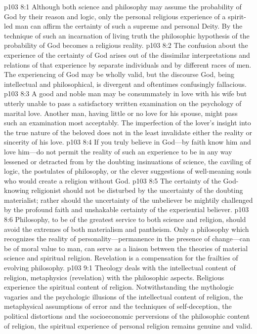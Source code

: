 \vs p103 8:1 Although both science and philosophy may assume the probability of God by their reason and logic, only the personal religious experience of a spirit\hyp{}led man can affirm the certainty of such a supreme and personal Deity. By the technique of such an incarnation of living truth the philosophic hypothesis of the probability of God becomes a religious reality.
\vs p103 8:2 The confusion about the experience of the certainty of God arises out of the dissimilar interpretations and relations of that experience by separate individuals and by different races of men. The experiencing of God may be wholly valid, but the discourse  God, being intellectual and philosophical, is divergent and oftentimes confusingly fallacious.
\vs p103 8:3 A good and noble man may be consummately in love with his wife but utterly unable to pass a satisfactory written examination on the psychology of marital love. Another man, having little or no love for his spouse, might pass such an examination most acceptably. The imperfection of the lover’s insight into the true nature of the beloved does not in the least invalidate either the reality or sincerity of his love.
\pc \vs p103 8:4 If you truly believe in God---by faith know him and love him---do not permit the reality of such an experience to be in any way lessened or detracted from by the doubting insinuations of science, the caviling of logic, the postulates of philosophy, or the clever suggestions of well\hyp{}meaning souls who would create a religion without God.
\vs p103 8:5 The certainty of the God\hyp{}knowing religionist should not be disturbed by the uncertainty of the doubting materialist; rather should the uncertainty of the unbeliever be mightily challenged by the profound faith and unshakable certainty of the experiential believer.
\pc \vs p103 8:6 Philosophy, to be of the greatest service to both science and religion, should avoid the extremes of both materialism and pantheism. Only a philosophy which recognizes the reality of personality---permanence in the presence of change---can be of moral value to man, can serve as a liaison between the theories of material science and spiritual religion. Revelation is a compensation for the frailties of evolving philosophy.
\vs p103 9:1 Theology deals with the intellectual content of religion, metaphysics (revelation) with the philosophic aspects. Religious experience  the spiritual content of religion. Notwithstanding the mythologic vagaries and the psychologic illusions of the intellectual content of religion, the metaphysical assumptions of error and the techniques of self\hyp{}deception, the political distortions and the socioeconomic perversions of the philosophic content of religion, the spiritual experience of personal religion remains genuine and valid.
